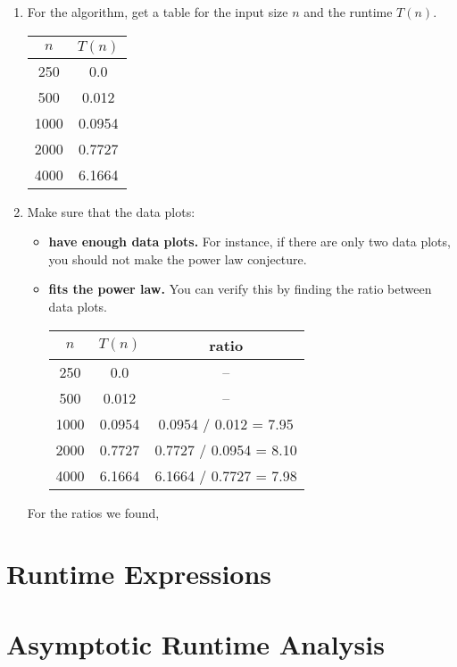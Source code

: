 \documentclass{report}
\begin{document}
\begin{enumerate}
  \item For the algorithm, get a table for the input size $n$ and the runtime $T(n)$.
    \begin{center}
      \begin{tabular}{ | c | c | } %
        \hline
        $n$ & $T(n)$ \\
        \hline
        250 & 0.0 \\
        500 & 0.012 \\
        1000 & 0.0954 \\
        2000 & 0.7727 \\
        4000 & 6.1664 \\
        \hline
      \end{tabular}
    \end{center}
  \item Make sure that the data plots:
    \begin{itemize}
      \item \textbf{have enough data plots.} For instance, if there are only two data plots, you should not make the power law conjecture.
      \item \textbf{fits the power law.} You can verify this by finding the ratio between data plots.
        \begin{center}
          \begin{tabular}{ | c | c | c | }
            \hline
            $n$ & $T(n)$ & ratio \\
            \hline
            250 & 0.0 & -- \\
            500 & 0.012 & -- \\
            1000 & 0.0954 & 0.0954 / 0.012 = 7.95 \\
            2000 & 0.7727 & 0.7727 / 0.0954 = 8.10 \\
            4000 & 6.1664 & 6.1664 / 0.7727 = 7.98 \\
            \hline
          \end{tabular}
        \end{center}
    \end{itemize}
    For the ratios we found, 
\end{enumerate}

\section{Runtime Expressions}

\section{Asymptotic Runtime Analysis}
\end{document}
